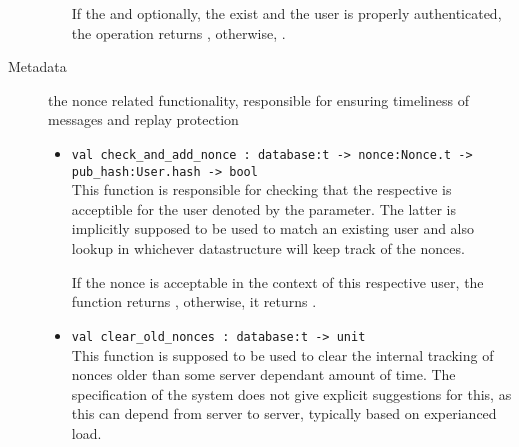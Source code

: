 \begin{description}
\begin{itemize}
  If the  and optionally, the  exist and the user is properly authenticated, the operation returns , otherwise, .

  \end{itemize}
  \item[Metadata] the nonce related functionality, responsible for ensuring timeliness of messages and replay protection
  \begin{itemize}
  \item \verb|val check_and_add_nonce : database:t -> nonce:Nonce.t -> pub_hash:User.hash -> bool| \\
  This function is responsible for checking that the respective  is acceptible for the user denoted by the  parameter.
  The latter is implicitly supposed to be used to match an existing user and also lookup in whichever datastructure will keep track of the nonces.

  If the nonce is acceptable in the context of this respective user, the function returns , otherwise, it returns .

  \item \verb|val clear_old_nonces : database:t -> unit| \\
  This function is supposed to be used to clear the internal tracking of nonces older than some server dependant amount of time.
  The specification of the system does not give explicit suggestions for this, as this can depend from server to server, typically based on experianced load.
  \end{itemize}
\end{description}

